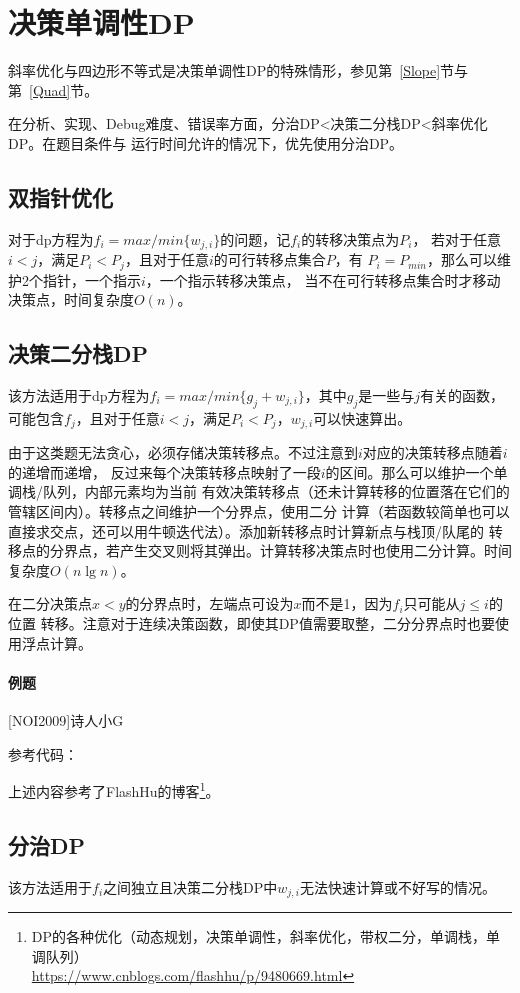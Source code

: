 \section{决策单调性DP}
斜率优化与四边形不等式是决策单调性DP的特殊情形，参见第~\ref{Slope}节与
第~\ref{Quad}节。

在分析、实现、Debug难度、错误率方面，分治DP<决策二分栈DP<斜率优化DP。在题目条件与
运行时间允许的情况下，优先使用分治DP。
\subsection{双指针优化}
对于dp方程为$f_i=max/min\{w_{j,i}\}$的问题，记$f_i$的转移决策点为$P_i$，
若对于任意$i<j$，满足$P_i<P_j$，且对于任意$i$的可行转移点集合$P$，有
$P_i=P_{min}$，那么可以维护2个指针，一个指示$i$，一个指示转移决策点，
当不在可行转移点集合时才移动决策点，时间复杂度$O(n)$。
\subsection{决策二分栈DP}
该方法适用于dp方程为$f_i=max/min\{g_j+w_{j,i}\}$，其中$g_j$是一些与$j$有关的函数，
可能包含$f_j$，且对于任意$i<j$，满足$P_i<P_j$，$w_{j,i}$可以快速算出。

由于这类题无法贪心，必须存储决策转移点。不过注意到$i$对应的决策转移点随着$i$的递增而递增，
反过来每个决策转移点映射了一段$i$的区间。那么可以维护一个单调栈/队列，内部元素均为当前
有效决策转移点（还未计算转移的位置落在它们的管辖区间内）。转移点之间维护一个分界点，使用二分
计算（若函数较简单也可以直接求交点，还可以用牛顿迭代法）。添加新转移点时计算新点与栈顶/队尾的
转移点的分界点，若产生交叉则将其弹出。计算转移决策点时也使用二分计算。时间复杂度$O(n\lg n)$。

在二分决策点$x<y$的分界点时，左端点可设为$x$而不是1，因为$f_i$只可能从$j\leq i$的位置
转移。注意对于连续决策函数，即使其DP值需要取整，二分分界点时也要使用浮点计算。

\paragraph{例题} [NOI2009]诗人小G

参考代码：


上述内容参考了FlashHu的博客\footnote{
    DP的各种优化（动态规划，决策单调性，斜率优化，带权二分，单调栈，单调队列）\\
    \url{https://www.cnblogs.com/flashhu/p/9480669.html}
}。
\subsection{分治DP}
该方法适用于$f_i$之间独立且决策二分栈DP中$w_{j,i}$无法快速计算或不好写的情况。


